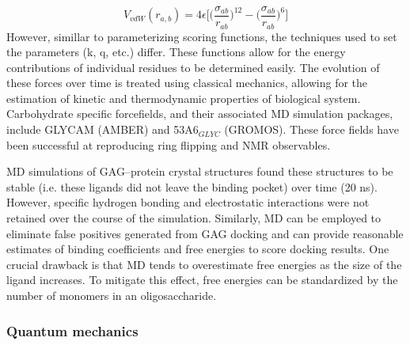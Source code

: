 \documentclass[journal=jctcce,manuscript=article]{achemso}
\begin{document}
{\begin{equation} \label{eq:7}
V_{vdW}(r_{a, b}) = 4\epsilon \Bigg[ \bigg(\frac{\sigma_{ab}}{r_{ab}} \bigg) ^{12} - \bigg( \frac{\sigma_{ab}}{r_{ab}} \bigg) ^{6} \Bigg]
\end{equation}
However, simillar to parameterizing scoring functions, the techniques used to set the parameters (k, q, etc.) differ.\cite{Woods2010ComputationalComplexes}
These functions allow for the energy contributions of individual residues to be determined easily. The evolution of these forces over time is treated using classical mechanics, allowing for the estimation of kinetic and thermodynamic properties of biological system. Carbohydrate specific forcefields, and their associated \ac{MD} simulation packages, include GLYCAM (AMBER) and 53A6$_{GLYC}$ (GROMOS). These force fields have been successful at reproducing ring flipping and NMR observables. 

\ac{MD} simulations of \ac{GAG}--protein crystal structures found these structures to be stable (i.e. these ligands did not leave the binding pocket) over time (20 ns). However, specific hydrogen bonding and electrostatic interactions were not retained over the course of the simulation. Similarly, \ac{MD} can be employed to eliminate false positives generated from \ac{GAG} docking and can provide reasonable estimates of binding coefficients and free energies to score docking results. One crucial drawback is that \ac{MD} tends to overestimate free energies as the size of the ligand increases. To mitigate this effect, free energies can be standardized by the number of monomers in an oligosaccharide.

\subsubsection{Quantum mechanics} \label{QM}

}
\end{document}
